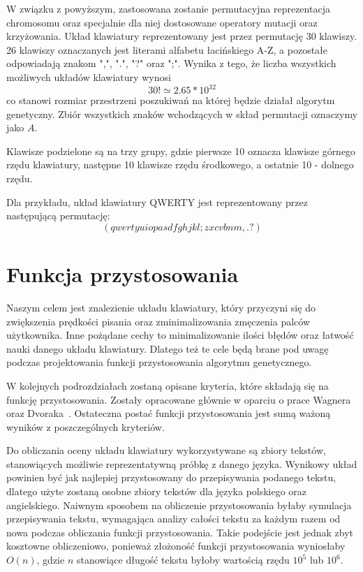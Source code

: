\documentclass{xmgr}
\begin{document}
W związku z powyższym, zastosowana zostanie permutacyjna reprezentacja chromosomu oraz specjalnie dla niej dostosowane operatory mutacji oraz krzyżowania. Układ klawiatury reprezentowany jest przez permutację 30 klawiszy. 26 klawiszy oznaczanych jest literami alfabetu łacińskiego A-Z, a pozostałe odpowiadają znakom ",", ".", "?" oraz ";". Wynika z tego, że liczba wszystkich możliwych układów klawiatury wynosi $$ 30! \simeq 2.65 * 10^{32} $$ co stanowi rozmiar przestrzeni poszukiwań na której będzie działał algorytm genetyczny. Zbiór wszystkich znaków wchodzących w skład permutacji oznaczymy jako $ A $.

Klawisze podzielone są na trzy grupy, gdzie pierwsze 10 oznacza klawisze górnego rzędu klawiatury, następne 10 klawisze rzędu środkowego, a ostatnie 10 - dolnego rzędu.

Dla przykładu, układ klawiatury QWERTY jest reprezentowany przez następującą permutację:
$$ (qwertyuiopasdfghjkl;zxcvbnm,.?) $$


\section{Funkcja przystosowania}

Naszym celem jest znalezienie układu klawiatury, który przyczyni się do zwiększenia prędkości pisania oraz zminimalizowania zmęczenia palców użytkownika. Inne pożądane cechy to minimalizowanie ilości błędów oraz łatwość nauki danego układu klawiatury. Dlatego też te cele będą brane pod uwagę podczas projektowania funkcji przystosowania algorytmu genetycznego.

W kolejnych podrozdziałach zostaną opisane kryteria, które składają się na funkcję przystosowania. Zostały opracowane głównie w oparciu o prace Wagnera~\cite{Eggers2003672} oraz Dvoraka~\cite{cassingham1986dvorak}. Ostateczna postać funkcji przystosowania jest sumą ważoną wyników z poszczególnych kryteriów.

Do obliczania oceny układu klawiatury wykorzystywane są zbiory tekstów, stanowiących możliwie reprezentatywną próbkę z danego języka. Wynikowy układ powinien być jak najlepiej przystosowany do przepisywania podanego tekstu, dlatego użyte zostaną osobne zbiory tekstów dla języka polskiego oraz angielskiego. Naiwnym sposobem na obliczenie przystosowania byłaby symulacja przepisywania tekstu, wymagająca analizy całości tekstu za każdym razem od nowa podczas obliczania funkcji przystosowania. Takie podejście jest jednak zbyt kosztowne obliczeniowo, ponieważ złożoność funkcji przystosowania wyniosłaby $ O(n) $, gdzie $ n $ stanowiące długość tekstu byłoby wartością rzędu $ 10^5 $ lub $ 10^6 $.
\end{document}
